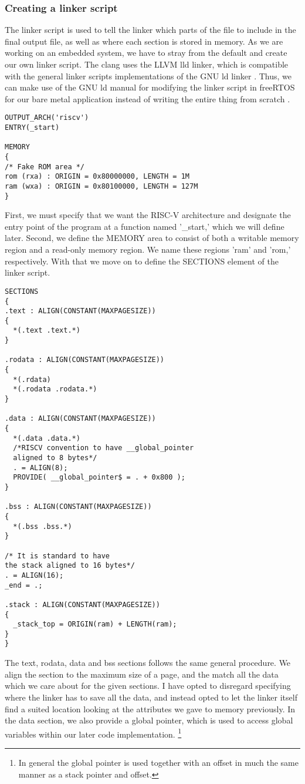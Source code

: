 \subsubsection{Creating a linker script}
The linker script is used to tell the linker which parts of the file to include
in the final output file, as well as where each section is stored in memory. As
we are working on an embedded system, we have to stray from the default and
create our own linker script. The clang uses the LLVM lld linker, which is compatible
with the general linker scripts implementations of the GNU ld linker \cite{llvm-org-linker}.
Thus, we can make use of the GNU ld manual for modifying the linker script in freeRTOS for our bare metal application instead of writing the entire thing from scratch \cite{GNU-linker}.

\begin{lstlisting}
OUTPUT_ARCH('riscv')
ENTRY(_start)

MEMORY
{
/* Fake ROM area */
rom (rxa) : ORIGIN = 0x80000000, LENGTH = 1M
ram (wxa) : ORIGIN = 0x80100000, LENGTH = 127M
}
\end{lstlisting}
First, we must specify that we want the RISC-V architecture and designate the entry point
of the program at a function named '\_start,' which we will define later.
Second, we define the MEMORY area to consist of both a writable memory region and a read-only
memory region. We name these regions 'ram' and 'rom,' respectively. With that we move on to define the SECTIONS element of the linker script.

\begin{lstlisting}
SECTIONS
{
.text : ALIGN(CONSTANT(MAXPAGESIZE))
{
  *(.text .text.*)
}

.rodata : ALIGN(CONSTANT(MAXPAGESIZE))
{
  *(.rdata)
  *(.rodata .rodata.*)
}

.data : ALIGN(CONSTANT(MAXPAGESIZE))
{
  *(.data .data.*)
  /*RISCV convention to have __global_pointer
  aligned to 8 bytes*/
  . = ALIGN(8);
  PROVIDE( __global_pointer$ = . + 0x800 );
}

.bss : ALIGN(CONSTANT(MAXPAGESIZE))
{
  *(.bss .bss.*)
}

/* It is standard to have
the stack aligned to 16 bytes*/
. = ALIGN(16);
_end = .;

.stack : ALIGN(CONSTANT(MAXPAGESIZE))
{
  _stack_top = ORIGIN(ram) + LENGTH(ram);
}
}
\end{lstlisting}
The text, rodata, data and bss sections follows the same general procedure. We align the
section to the maximum size of a page, and the match all the data which we care about for
the given sections. I have opted to disregard specifying where the linker has to save
all the data, and instead opted to let the linker itself find a suited location looking at
the attributes we gave to memory previously.
In the data section, we also provide a global pointer, which is used to access global variables
within our later code implementation. \footnote{In general the global pointer is used together
with an offset in much the same manner as a stack pointer and offset.}

